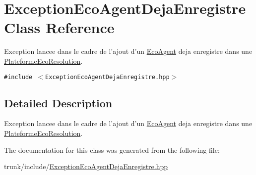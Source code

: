 \hypertarget{classExceptionEcoAgentDejaEnregistre}{
\section{ExceptionEcoAgentDejaEnregistre Class Reference}
\label{classExceptionEcoAgentDejaEnregistre}
}
Exception lancee dans le cadre de l'ajout d'un \hyperlink{classEcoAgent}{EcoAgent} deja enregistre dans une \hyperlink{classPlateformeEcoResolution}{PlateformeEcoResolution}.  


{\tt \#include $<$ExceptionEcoAgentDejaEnregistre.hpp$>$}



\subsection{Detailed Description}
Exception lancee dans le cadre de l'ajout d'un \hyperlink{classEcoAgent}{EcoAgent} deja enregistre dans une \hyperlink{classPlateformeEcoResolution}{PlateformeEcoResolution}. 

The documentation for this class was generated from the following file:\begin{CompactItemize}
\item 
trunk/include/\hyperlink{ExceptionEcoAgentDejaEnregistre_8hpp}{ExceptionEcoAgentDejaEnregistre.hpp}\end{CompactItemize}
